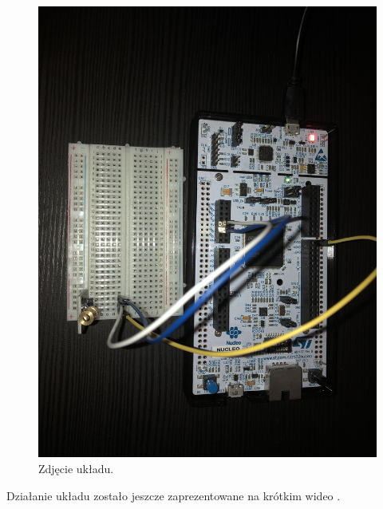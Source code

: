 \documentclass[11pt, a4paper]{article}
\begin{document}
\vspace{0.5cm}
\begin{figure}[h!]
    \centering
    \includegraphics[width=1\textwidth]{fig/laser/zdjecieukladu.png}
    \caption{Zdjęcie układu.}
    \label{fig:my_label}
\end{figure}

Działanie układu zostało jeszcze zaprezentowane na krótkim wideo \cite{youtube}.

\printbibliography[heading=bibintoc]
\end{document}
